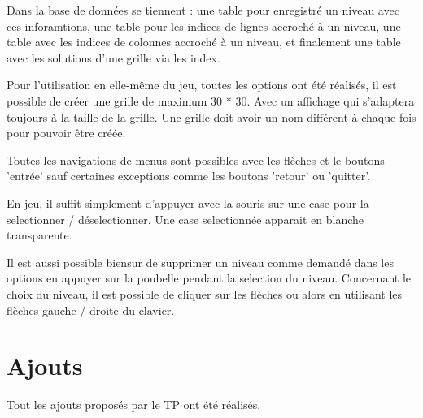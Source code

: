 \documentclass[a4paper]{article}
\begin{document}
Dans la base de données se tiennent : une table pour enregistré un niveau avec ces inforamtions, une table pour les indices de lignes accroché à un niveau, une table avec les indices de colonnes accroché à un niveau, et finalement une table avec les solutions d'une grille via les index.

Pour l'utilisation en elle-même du jeu, toutes les options ont été réalisés, il est possible de créer une grille de maximum 30 * 30. Avec un affichage qui s'adaptera toujours à la taille de la grille. Une grille doit avoir un nom différent à chaque fois pour pouvoir être créée.

Toutes les navigations de menus sont possibles avec les flèches et le boutons 'entrée' sauf certaines exceptions comme les boutons 'retour' ou 'quitter'.

En jeu, il suffit simplement d'appuyer avec la souris sur une case pour la selectionner / déselectionner. Une case selectionnée apparait en blanche transparente.

Il est aussi possible biensur de supprimer un niveau comme demandé dans les options en appuyer sur la poubelle pendant la selection du niveau.
Concernant le choix du niveau, il est possible de cliquer sur les flèches ou alors en utilisant les flèches gauche / droite du clavier.

\section{Ajouts}

Tout les ajouts proposés par le TP ont été réalisés.
\end{document}
